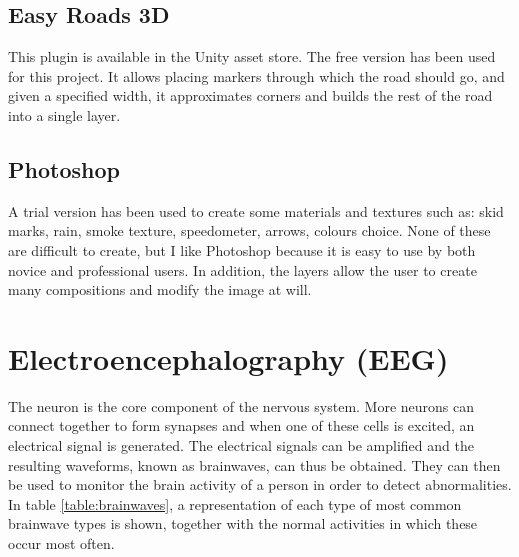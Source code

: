 \subsection{Easy Roads 3D}
This plugin is available in the Unity asset store. The free version has been used for this project. It allows placing markers through which the road should go, and given a specified width, it approximates corners and builds the rest of the road into a single layer.

\subsection{Photoshop}
A trial version has been used to create some materials and textures such as: skid marks, rain, smoke texture, speedometer, arrows, colours choice. None of these are difficult to create, but I like Photoshop because it is easy to use by both novice and professional users. In addition, the layers allow the user to create many compositions and modify the image at will.

\section{Electroencephalography (EEG)}
The neuron is the core component of the nervous system. More neurons can connect together to form synapses and when one of these cells is excited, an electrical signal is generated. The electrical signals can be amplified and the resulting waveforms, known as brainwaves, can thus be obtained. They can then be used to monitor the brain activity of a person in order to detect abnormalities. In table \ref{table:brainwaves}, a representation of each type of most common brainwave types is shown, together with the normal activities in which these occur most often. 

